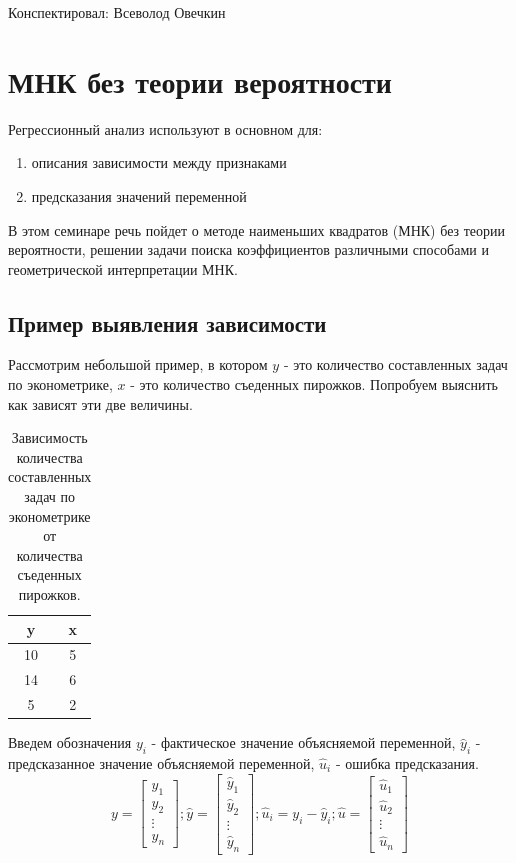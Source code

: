 \documentclass[12pt]{article} %
\theoremstyle{definition} %
\def \hy{\hat{y}}
\def \hu{\hat{u}}
\begin{document}
Конспектировал: Всеволод Овечкин
\section{МНК без теории вероятности}

Регрессионный анализ используют в основном для:
\begin{enumerate}
    \item описания зависимости между признаками
    \item предсказания значений переменной
\end{enumerate}

В этом семинаре речь пойдет о методе наименьших квадратов (МНК) без теории вероятности, решении задачи поиска коэффициентов различными способами и геометрической интерпретации МНК.

\subsection{Пример выявления зависимости}

Рассмотрим небольшой пример, в котором $y$ - это количество составленных задач по эконометрике, $x$ - это количество съеденных пирожков. Попробуем выяснить как зависят эти две величины.

\begin{table}[h!]
    \centering
    \begin{tabular}{c|c}
        \hline
        y & x \\
        \hline
        10 & 5 \\
        14 & 6 \\
        5 & 2
    \end{tabular}
    \caption{Зависимость количества составленных задач по эконометрике от количества съеденных пирожков.}
    \label{fist_table}
\end{table}

Введем обозначения $y_i$ - фактическое значение объясняемой переменной, $\hy_i$ - предсказанное значение объясняемой переменной, $\hu_i$ - ошибка предсказания.
\[
y = \begin{bmatrix}
           y_{1} \\
           y_{2} \\
           \vdots \\
           y_{n}
         \end{bmatrix}; 
\hy = \begin{bmatrix}
           \hy_{1} \\
           \hy_{2} \\
           \vdots \\
           \hy_{n}
         \end{bmatrix}; 
\hu_i = y_i - \hy_i; 
\hu = \begin{bmatrix}
           \hu_{1} \\
           \hu_{2} \\
           \vdots \\
           \hu_{n}
         \end{bmatrix}
\]
\end{document}
